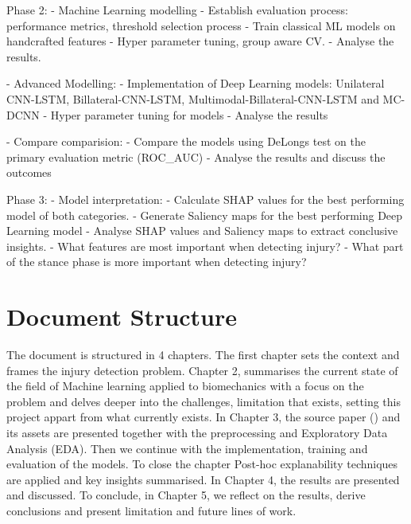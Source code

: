 Phase 2:
- Machine Learning modelling
    - Establish evaluation process: performance metrics, threshold selection process
    - Train classical ML models on handcrafted features
    - Hyper parameter tuning, group aware CV.
    - Analyse the results.

- Advanced Modelling:
    - Implementation of Deep Learning models: Unilateral CNN-LSTM, Billateral-CNN-LSTM, Multimodal-Billateral-CNN-LSTM and MC-DCNN
    - Hyper parameter tuning for models
    - Analyse the results

- Compare comparision:
    - Compare the models using DeLongs test on the primary evaluation metric (ROC_AUC)
    - Analyse the results and discuss the outcomes

Phase 3:
- Model interpretation:
    - Calculate SHAP values for the best performing model of both categories.
    - Generate Saliency maps for the best performing Deep Learning model
    - Analyse SHAP values and Saliency maps to extract conclusive insights.
        - What features are most important when detecting injury?
        - What part of the stance phase is more important when detecting injury?

\section{Document Structure}\label{sec:intro-structure}
The document is structured in 4 chapters. The first chapter sets the context and frames the injury detection problem. Chapter 2, summarises the current state of the field of Machine learning applied to biomechanics with a focus on the problem and delves deeper into the challenges, limitation that exists, setting this project appart from what currently exists. In Chapter 3, the source paper (\cite{Ferber2024}) and its assets are presented together with the preprocessing and Exploratory Data Analysis (EDA). Then we continue with the implementation, training and evaluation of the models. To close the chapter Post-hoc explanability techniques are applied and key insights summarised. In Chapter 4, the results are presented and discussed. To conclude, in Chapter 5, we reflect on the results, derive conclusions and present limitation and future lines of work.
